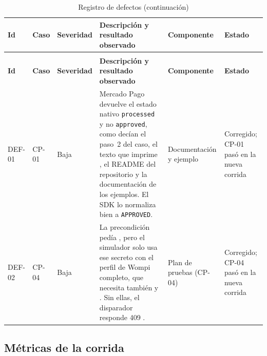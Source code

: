 {\small
\renewcommand{\arraystretch}{1.25}
\setlength{\tabcolsep}{3pt}
\begin{xltabular}{\textwidth}{|>{\raggedright\arraybackslash}p{1.35cm}|>{\raggedright\arraybackslash}p{1.25cm}|>{\raggedright\arraybackslash}p{1.55cm}|>{\raggedright\arraybackslash}X|>{\raggedright\arraybackslash}p{2.15cm}|>{\raggedright\arraybackslash}p{1.6cm}|}
\caption{Registro de defectos}\label{tab:defectos}\\
\hline
\textbf{Id} & \textbf{Caso} & \textbf{Severidad} & \textbf{Descripción y resultado observado} & \textbf{Componente} & \textbf{Estado} \\ \hline
\endfirsthead
\caption[]{Registro de defectos (continuación)}\\
\hline
\textbf{Id} & \textbf{Caso} & \textbf{Severidad} & \textbf{Descripción y resultado observado} & \textbf{Componente} & \textbf{Estado} \\ \hline
\endhead
DEF-01 & CP-01 & Baja & Mercado Pago devuelve el estado nativo \texttt{processed} y no \texttt{approved}, como decían el paso~2 del caso, el texto que imprime , el README del repositorio y la documentación de los ejemplos. El SDK lo normaliza bien a \texttt{APPROVED}. & Documentación y ejemplo & Corregido; CP-01 pasó en la nueva corrida \\ \hline
DEF-02 & CP-04 & Baja & La precondición pedía , pero el simulador solo usa ese secreto con el perfil de Wompi completo, que necesita también  y . Sin ellas, el disparador responde 409 . & Plan de pruebas (CP-04) & Corregido; CP-04 pasó en la nueva corrida \\ \hline
\end{xltabular}
}

\subsection{Métricas de la corrida}

